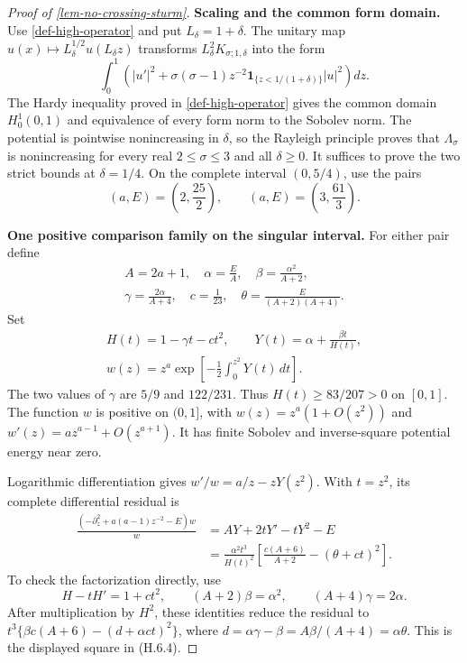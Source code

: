 \documentclass[11pt,a4paper]{article}
\theoremstyle{proofmanuscript}
\begin{document}
\begin{proof}[Proof of \ref{lem-no-crossing-sturm}]

\textbf{Scaling and the common form domain.} Use \ref{def-high-operator} and put \(L_\delta=1+\delta\). The unitary map \(u(x)\mapsto L_\delta^{1/2}u(L_\delta z)\) transforms \(L_\delta^2K_{\sigma;1,\delta}\) into the form \[
\int_0^1\left(|u'|^2+\sigma(\sigma-1)z^{-2}
\mathbf1_{\{z<1/(1+\delta)\}}|u|^2\right)dz.
\] The Hardy inequality proved in \ref{def-high-operator} gives the common domain \(H_0^1(0,1)\) and equivalence of every form norm to the Sobolev norm. The potential is pointwise nonincreasing in \(\delta\), so the Rayleigh principle proves that \(\Lambda_\sigma\) is nonincreasing for every real \(2\le\sigma\le3\) and all \(\delta\ge0\). It suffices to prove the two strict bounds at \(\delta=1/4\). On the complete interval \((0,5/4)\), use the pairs \[
(a,E)=\left(2,\frac{25}{2}\right),\qquad
(a,E)=\left(3,\frac{61}{3}\right).
\tag{H.6.2}
\]

\textbf{One positive comparison family on the singular interval.} For either pair define \[
\begin{gathered}
A=2a+1,\quad \alpha=\frac EA,\quad
\beta=\frac{\alpha^2}{A+2},\\
\gamma=\frac{2\alpha}{A+4},\quad
c=\frac1{23},\quad
\theta=\frac{E}{(A+2)(A+4)}.
\end{gathered}
\] Set \[
\begin{gathered}
H(t)=1-\gamma t-ct^2,\qquad
Y(t)=\alpha+\frac{\beta t}{H(t)},\\
w(z)=z^a\exp\left[-\frac12\int_0^{z^2}Y(t)\,dt\right].
\end{gathered}
\tag{H.6.3}
\] The two values of \(\gamma\) are \(5/9\) and \(122/231\). Thus \(H(t)\ge83/207>0\) on \([0,1]\). The function \(w\) is positive on \((0,1]\), with \(w(z)=z^a(1+O(z^2))\) and \(w'(z)=az^{a-1}+O(z^{a+1})\). It has finite Sobolev and inverse-square potential energy near zero.

Logarithmic differentiation gives \(w'/w=a/z-zY(z^2)\). With \(t=z^2\), its complete differential residual is \[
\begin{aligned}
\frac{(-\partial_z^2+a(a-1)z^{-2}-E)w}{w}
&=AY+2tY'-tY^2-E\\
&=\frac{\alpha^2t^3}{H(t)^2}
\left[\frac{c(A+6)}{A+2}-(\theta+ct)^2\right].
\end{aligned}
\tag{H.6.4}
\] To check the factorization directly, use \[
H-tH'=1+ct^2,\qquad
(A+2)\beta=\alpha^2,\qquad
(A+4)\gamma=2\alpha.
\] After multiplication by \(H^2\), these identities reduce the residual to \(t^3\{\beta c(A+6)-(d+\alpha ct)^2\}\), where \(d=\alpha\gamma-\beta=A\beta/(A+4)=\alpha\theta\). This is the displayed square in (H.6.4).


\end{proof}
\end{document}
